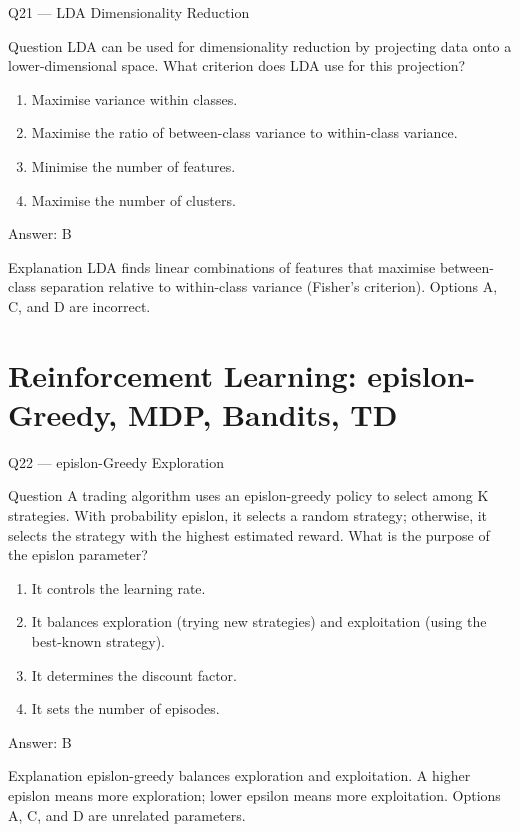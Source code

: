 \documentclass[aspectratio=169,8pt]{beamer}
\begin{document}
	\begin{frame}{Q21 --- LDA Dimensionality Reduction}
		\begin{block}{Question}
			LDA can be used for dimensionality reduction by projecting data onto a lower-dimensional space. What criterion does LDA use for this projection?
			\begin{enumerate}
				\item Maximise variance within classes.
				\item Maximise the ratio of between-class variance to within-class variance.
				\item Minimise the number of features.
				\item Maximise the number of clusters.
			\end{enumerate}
		\end{block}
		\begin{exampleblock}{Answer: B}\end{exampleblock}
		\begin{block}{Explanation}
			LDA finds linear combinations of features that maximise between-class separation relative to within-class variance (Fisher's criterion). Options A, C, and D are incorrect.
		\end{block}
	\end{frame}
	
	\section{Reinforcement Learning: epislon-Greedy, MDP, Bandits, TD}
	
	\begin{frame}{Q22 --- epislon-Greedy Exploration}
		\begin{block}{Question}
			A trading algorithm uses an epislon-greedy policy to select among K strategies. With probability epislon, it selects a random strategy; otherwise, it selects the strategy with the highest estimated reward. What is the purpose of the epislon parameter?
			\begin{enumerate}
				\item It controls the learning rate.
				\item It balances exploration (trying new strategies) and exploitation (using the best-known strategy).
				\item It determines the discount factor.
				\item It sets the number of episodes.
			\end{enumerate}
		\end{block}
		\begin{exampleblock}{Answer: B}\end{exampleblock}
		\begin{block}{Explanation}
			epislon-greedy balances exploration and exploitation. A higher epislon means more exploration; lower epsilon means more exploitation. Options A, C, and D are unrelated parameters.
		\end{block}
	\end{frame}
	
\end{document}
